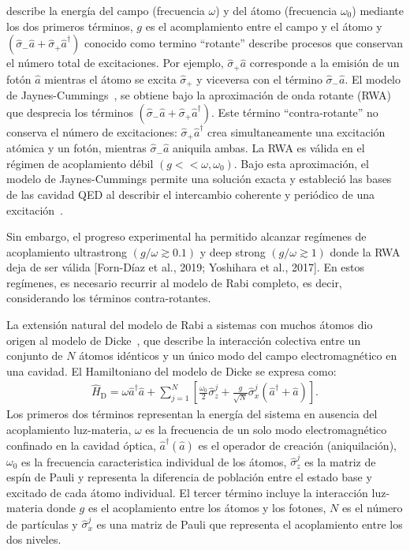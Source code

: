 \documentclass[onecolumn,notitlepage,letterpaper,aps,pra,12pt]{article}
\numberwithin{equation}{section}
\begin{document}
describe la energía del campo (frecuencia $\omega$) y del átomo (frecuencia $\omega_{0}$) mediante los dos primeros términos, $g$ es el acomplamiento entre el campo y el átomo y $(\hat{\sigma}_{-}\hat{a} + \hat{\sigma}_{+}\hat{a}^{\dagger})$ conocido como termino ``rotante'' describe procesos que conservan el número total de excitaciones. Por ejemplo, $\hat{\sigma}_{+}\hat{a}$ corresponde a la emisión de un fotón $\hat{a}$ mientras el átomo se excita $\hat{\sigma}_{+}$ y viceversa con el término $\hat{\sigma}_{-}\hat{a}$. El modelo de Jaynes-Cummings~\cite{Jaynes1963}, se obtiene bajo la aproximación de onda rotante (RWA) que desprecia los términos $(\hat{\sigma}_{-}\hat{a} + \hat{\sigma}_{+}\hat{a}^{\dagger})$. Este término  ``contra-rotante'' no conserva el número de excitaciones: $\hat{\sigma}_{+}\hat{a}^{\dagger}$ crea simultaneamente una excitación atómica y un fotón, mientras $\hat{\sigma}_{-}\hat{a}$ aniquila ambas. La RWA es válida en el régimen de acoplamiento débil $(g<<\omega,\omega_{0})$. Bajo esta aproximación, el modelo de Jaynes-Cummings permite una solución exacta y estableció las bases de las cavidad QED al describir el intercambio coherente y periódico de una excitación~\cite{wallraff2004,Schoelkopf2008,devoret2013}.

Sin embargo, el progreso experimental ha permitido alcanzar regímenes de acoplamiento ultrastrong $(g/\omega \gtrsim 0.1)$ y deep strong $(g/\omega \gtrsim 1)$ donde la RWA deja de ser válida [Forn-Díaz et al., 2019; Yoshihara et al., 2017]. En estos regímenes, es necesario recurrir al modelo de Rabi completo, es decir, considerando los términos contra-rotantes.

La extensión natural del modelo de Rabi a sistemas con muchos átomos dio origen al modelo de Dicke~\cite{Dicke54}, que describe la interacción colectiva entre un conjunto de $N$ átomos idénticos y un único modo del campo electromagnético en una cavidad. El Hamiltoniano del modelo de Dicke se expresa como:
\begin{gather}
    \hat{H}_{\text{D}} = \omega\hat{a}^{\dagger}\hat{a} + \sum_{j=1}^{N}\left[ \frac{\omega_{0}}{2}\hat{\sigma}_{z}^{j} + \frac{g}{\sqrt{N}}\hat{\sigma}_{x}^{j}\left(\hat{a}^{\dagger} + \hat{a}\right) \right].
\end{gather}
Los primeros dos términos representan la energía del sistema en ausencia del acoplamiento luz-materia, $\omega$ es la frecuencia de un solo modo electromagnético confinado en la cavidad óptica, $\hat{a}^{\dagger}(\hat{a})$ es el operador de creación (aniquilación), $\omega_{0}$ es la frecuencia caracteristica individual de los átomos, $\hat{\sigma}_{z}^{j}$ es la matriz de espín de Pauli  y representa la diferencia de población entre el estado base y excitado de cada átomo individual. El tercer término incluye la interacción luz-materia donde $g$ es el acoplamiento entre los átomos y los fotones,  $N$ es el número de partículas y $\hat{\sigma}_{x}^{j}$ es una matriz de Pauli que representa el acoplamiento entre los dos niveles. 
\end{document}

